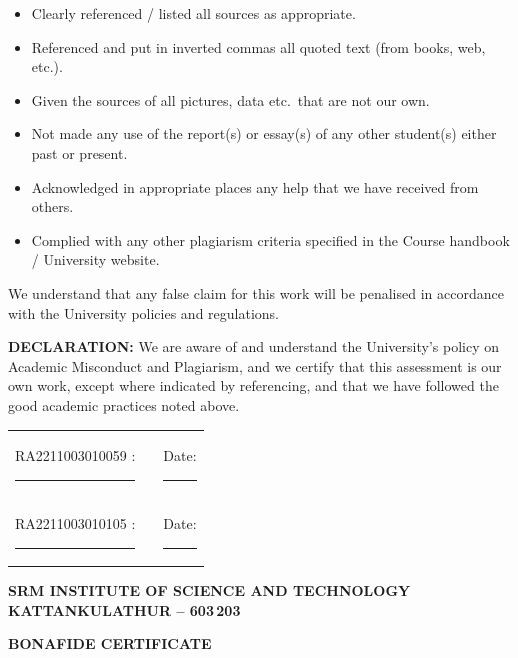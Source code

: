 \documentclass[12pt,a4paper,oneside]{report}
\begin{document}
\begin{itemize}[leftmargin=2em,itemsep=0.1em,topsep=0.2em]
  \item[$\square$] Clearly referenced / listed all sources as appropriate.
  \item[$\square$] Referenced and put in inverted commas all quoted text (from books, web, etc.).
  \item[$\square$] Given the sources of all pictures, data etc.\ that are not our own.
  \item[$\square$] Not made any use of the report(s) or essay(s) of any other student(s) either past or present.
  \item[$\square$] Acknowledged in appropriate places any help that we have received from others.
  \item[$\square$] Complied with any other plagiarism criteria specified in the Course handbook / University website.
\end{itemize}

\noindent We understand that any false claim for this work will be penalised in accordance with the University policies and regulations.

\vspace{0.4em}
\noindent\textbf{DECLARATION:} We are aware of and understand the University's policy on Academic Misconduct and Plagiarism, and we certify that this assessment is our own work, except where indicated by referencing, and that we have followed the good academic practices noted above.

\vspace{1.6em}
\noindent\begin{tabularx}{\linewidth}{@{}lXr@{}}
RA2211003010059 \quad : \quad \rule{6cm}{0.4pt} & & Date: \rule{2.5cm}{0.4pt} \\[1.2em]
RA2211003010105 \quad : \quad \rule{6cm}{0.4pt} & & Date: \rule{2.5cm}{0.4pt} \\
\end{tabularx}

\normalsize
\clearpage

\thispagestyle{empty}
\begin{center}
{\bfseries SRM INSTITUTE OF SCIENCE AND TECHNOLOGY\\
KATTANKULATHUR -- 603\,203\par}
\vspace{0.8cm}
{\bfseries\large BONAFIDE CERTIFICATE\par}
\end{center}
\end{document}
